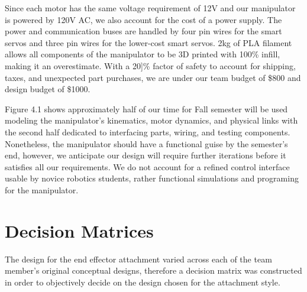 \documentclass[12pt]{report}
\begin{document}
Since each motor has the same voltage requirement of 12V and our manipulator is powered by 120V AC, we also account for the cost of a power supply. The power and communication buses are handled by four pin wires for the smart servos and three pin wires for the lower-cost smart servos. 2kg of PLA filament allows all components of the manipulator to be 3D printed with 100\% infill, making it an overestimate. With a 20]\% factor of safety to account for shipping, taxes, and unexpected part purchases, we are under our team budget of \$800 and design budget of \$1000.



Figure 4.1 shows approximately half of our time for Fall semester will be used modeling the manipulator’s kinematics, motor dynamics, and physical links with the second half dedicated to interfacing parts, wiring, and testing components. Nonetheless, the manipulator should have a functional guise by the semester’s end, however, we anticipate our design will require further iterations before it satisfies all our requirements. We do not account for a refined control interface usable by novice robotics students, rather functional simulations and programing for the manipulator.


\section{Decision Matrices}
The design for the end effector attachment varied across each of the team member’s original conceptual designs, therefore a decision matrix was constructed in order to objectively decide on the design chosen for the attachment style.


\end{document}
